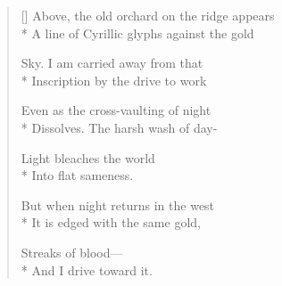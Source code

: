 \begin{verse}[\versewidth]
Above, the old orchard on the ridge appears\\*
A line of Cyrillic glyphs against the gold

Sky. I am carried away from that\\*
Inscription by the drive to work

Even as the cross-vaulting of night\\*
Dissolves.   The harsh wash of day-

Light bleaches the world\\*
Into flat sameness.

But when night returns in the west\\*
It is edged with the same gold,

Streaks of blood---\\*
And I drive toward it.
\end{verse}
